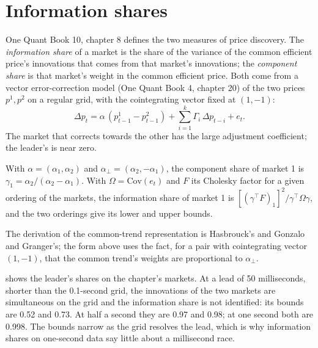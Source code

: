 \section{Information shares}

One Quant Book 10, chapter 8 defines the two measures of price discovery. The \emph{information share} of a market is the share of the variance of
the common efficient price's innovations that comes from that market's innovations; the \emph{component share} is that market's weight in the
common efficient price. Both come from a vector error-correction model (One Quant Book 4, chapter 20) of the two prices $p^1,p^2$ on a regular grid,
with the cointegrating vector fixed at $(1,-1)$:
\[
\Delta p_t=\alpha\,(p^1_{t-1}-p^2_{t-1})+\sum_{i=1}^{k}\Gamma_i\,\Delta p_{t-i}+e_t .
\]
The market that corrects towards the other has the large adjustment coefficient; the leader's is near zero.

\begin{proposition}\label{prop:hf:lead-lag-and-cross-venue-trading:shares}
With $\alpha=(\alpha_1,\alpha_2)$ and $\alpha_\perp=(\alpha_2,-\alpha_1)$, the component share of market 1 is $\gamma_1=\alpha_2/(\alpha_2-\alpha_1)$. With
$\Omega=\mathrm{Cov}(e_t)$ and $F$ its Cholesky factor for a given ordering of the markets, the information share of market 1 is
$[(\gamma^\top F)_1]^2/\gamma^\top\Omega\gamma$, and the two orderings give its lower and upper bounds.
\end{proposition}

\admitted
The derivation of the common-trend representation is Hasbrouck's and Gonzalo and Granger's; the form above uses the fact, for a pair with
cointegrating vector $(1,-1)$, that the common trend's weights are proportional to $\alpha_\perp$.

 shows the leader's shares on the chapter's markets. At a lead of 50 milliseconds, shorter
than the 0.1-second grid, the innovations of the two markets are simultaneous on the grid and the information share is not identified: its bounds are
0.52 and 0.73. At half a second they are 0.97 and 0.98; at one second both are 0.998. The bounds narrow as the grid resolves the lead, which is why
information shares on one-second data say little about a millisecond race.

